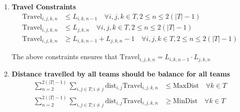 \documentclass[a4paper, 12pt]{article}
\begin{document}
\begin{enumerate}
    \item \textbf{Travel Constraints}
    \begin{align*}
        \text{Travel}_{i,j,k,n} &\leq L_{i,k,n-1} \quad \forall i,j,k \in T ,2 \leq n \leq 2(|T| - 1)\\
        \text{Travel}_{i,j,k,n} &\leq L_{j,k,n} \quad \forall i,j,k \in T ,2 \leq n \leq 2(|T| - 1)\\
        \text{Travel}_{i,j,k,n} &\geq L_{i,k,n-1} + L_{j,k,n} - 1 \quad \forall i,j,k \in T ,2 \leq n \leq 2(|T| - 1)
    \end{align*}

    The above constraints ensures that $\text{Travel}_{i,j,k,n} = L_{i,k,n-1}\cdot L_{j,k,n}$

    \item \textbf{Distance travelled by all teams should be balance for all teams}
    \begin{align*}
        \sum_{n = 2}^{2(|T| - 1)}\sum_{i,j \in T; i \neq j} \text{dist}_{i,j} \text{Travel}_{i,j,k,n} &\leq \text{MaxDist} \quad \forall k \in T \\
        \sum_{n = 2}^{2(|T|-1)}\sum_{i,j \in T; i \neq j} \text{dist}_{i,j} \text{Travel}_{i,j,k,n} &\geq \text{MinDist} \quad \forall k \in T
    \end{align*}

\end{enumerate}
\end{document}
